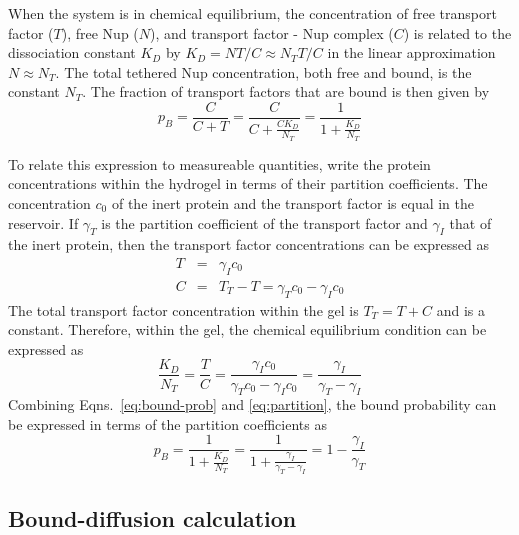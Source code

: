 When the system is in chemical equilibrium, the concentration of free transport factor ($T$), free Nup ($N$), and transport factor - Nup complex ($C$) is related to the dissociation constant $K_D$ by
$K_D = NT/C \approx N_TT/C$ in the linear approximation $N \approx N_T$.   The total tethered Nup concentration, both free and bound, is the constant $N_T$.  The fraction of transport factors that are bound is then given by
\begin{equation}
p_B = \frac{C}{C+T} = \frac{C}{C+\frac{CK_D}{N_T}} = \frac{1}{1+\frac{K_D}{N_T}} %
\label{eq:bound-prob}
\end{equation} %

To relate this expression to measureable quantities, write the protein concentrations within the hydrogel in terms of their partition coefficients. The concentration $c_0$ of the inert protein and the transport factor is equal in the reservoir.  If $\gamma_T$ is the partition coefficient of the transport factor and $\gamma_I$ that of the inert protein, then the transport factor concentrations can be expressed as
\begin{eqnarray}
T &=& \gamma_I c_0\\
C & =& T_T - T = \gamma_Tc_0 - \gamma_I c_0
\label{eq:gamma}
\end{eqnarray} 
The total transport factor concentration within the gel is $T_T = T + C$ and is a constant.
Therefore, within the gel, the chemical equilibrium condition can be expressed as
\begin{equation}
\frac{K_D}{N_T} = \frac{T}{C} = \frac{\gamma_I c_0}{\gamma_T c_0 - \gamma_I c_0} = \frac{\gamma_I}{\gamma_T - \gamma_I}
\label{eq:partition}
\end{equation}
Combining Eqns.~\ref{eq:bound-prob} and \ref{eq:partition}, the bound probability can be expressed in terms of the partition coefficients as
\begin{equation}
p_B= \frac{1}{1+\frac{K_D}{N_T}} = \frac{1}{1+\frac{\gamma_I}{\gamma_T - \gamma_I}} = 1 - \frac{\gamma_I}{\gamma_T}
\label{eq:bound-prob-final}
\end{equation}

\subsection{Bound-diffusion calculation}

